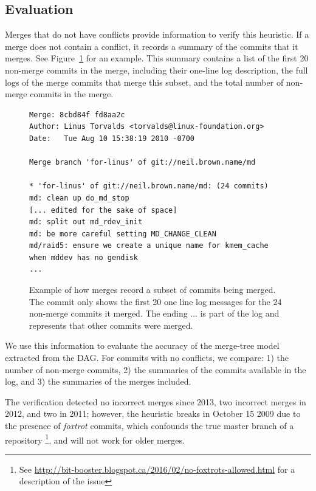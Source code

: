 \documentclass[conference, draftclsnofoot, draft]{IEEEtran}
\begin{document}
\subsection{Evaluation}

Merges that do not have conflicts provide information to verify this heuristic. If a
merge does not contain a conflict, it records a summary of the commits that it
merges. See Figure~\ref{fig:sampleMerge} for an example. This summary contains a
list of the first 20 non-merge commits in the merge, including their one-line log
description, the full logs of the merge commits that merge this subset, and the
total number of non-merge commits in the merge.

\begin{figure}[htbp]
        \centering
        {\tiny
        \begin{verbatim}
Merge: 8cbd84f fd8aa2c
Author: Linus Torvalds <torvalds@linux-foundation.org>
Date:   Tue Aug 10 15:38:19 2010 -0700

Merge branch 'for-linus' of git://neil.brown.name/md

* 'for-linus' of git://neil.brown.name/md: (24 commits)
md: clean up do_md_stop
[... edited for the sake of space]
md: split out md_rdev_init
md: be more careful setting MD_CHANGE_CLEAN
md/raid5: ensure we create a unique name for kmem_cache when mddev has no gendisk
...
        \end{verbatim}}
        \caption{Example of how merges record a subset of commits being merged. The
                commit only shows the first 20 one line log messages for the 24
                non-merge commits it merged. The ending ... is part of the log and
                represents that other commits were merged.}
        \label{fig:sampleMerge}
\end{figure}

We use this information to evaluate the accuracy of the merge-tree model extracted
from the DAG. For commits with no conflicts, we compare: 1) the number of non-merge
commits, 2) the summaries of the commits available in the log, and 3) the summaries
of the merges included.


The verification detected no incorrect merges since 2013, two incorrect merges in
2012, and two in 2011; however, the heuristic breaks in October 15 2009 due to the
presence of \textit{foxtrot} commits, which confounds the true master branch of a
repository
\footnote{See \url{http://bit-booster.blogspot.ca/2016/02/no-foxtrots-allowed.html} for a description of the issue}, and will not work for older merges.
\end{document}
